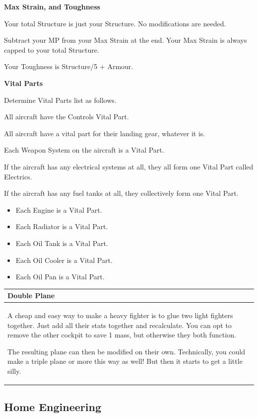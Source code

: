 \documentclass{article}
\begin{document}
\textbf{Max Strain, and Toughness}

Your total Structure is just your Structure. No modifications are
needed.

Subtract your MP from your Max Strain at the end. Your Max Strain
is always capped to your total Structure.

Your Toughness is Structure/5 + Armour.

\textbf{Vital Parts}

Determine Vital Parts list as follows.

All aircraft have the Controls Vital Part.

All aircraft have a vital part for their landing gear, whatever
it is.

Each Weapon System on the aircraft is a Vital Part.

If the aircraft has any electrical systems at all, they all form
one Vital Part called Electrics.

If the aircraft has any fuel tanks at all, they collectively form
one Vital Part.

\begin{itemize}
    \item Each Engine is a Vital Part.
    \item Each Radiator is a Vital Part.
    \item Each Oil Tank is a Vital Part.
    \item Each Oil Cooler is a Vital Part.
    \item Each Oil Pan is a Vital Part.
\end{itemize}

\begin{tabular}{|l}
    \hline
    Double Plane           \\\hline

    A cheap and easy way to make a heavy fighter is to glue two light
    fighters together. Just add all their stats together and recalculate.
    You can opt to remove the other cockpit to save 1 mass, but otherwise
    they both function.

    The resulting plane can then be modified on their own. Technically, you
    could make a triple plane or more this way as well! But then it starts
    to get a little silly. \\\hline
\end{tabular}

\subsection{Home Engineering}
\label{_Home_Engineering}
\end{document}
